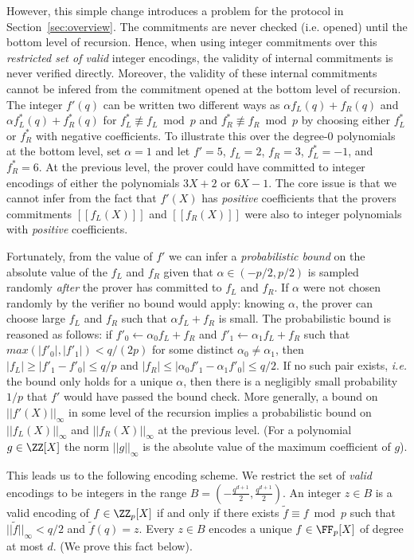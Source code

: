 However, this simple change introduces a problem for the protocol in Section~\ref{sec:overview}. The commitments are never checked (i.e. opened) until the bottom level of recursion. Hence, when using integer commitments over this \emph{restricted set of valid} integer encodings, the validity of internal commitments is never verified directly. Moreover, the validity of these internal commitments cannot be infered from the commitment opened at the bottom level of recursion. The integer $f'(q)$ can be written two different ways as $\alpha f_L(q) + f_R(q)$ and $\alpha f_L^*(q) + f_R^*(q)$ for $f^*_L \not \equiv f_L \bmod p$ and $f_R^* \not \equiv f_R \bmod p$ by choosing either $f_L^*$ or $f_R^*$ with negative coefficients. To illustrate this over the degree-0 polynomials at the bottom level, set $\alpha = 1$ and let $f' = 5$, $f_L = 2$, $f_R = 3$, $f_L^* = -1$, and $f^*_R = 6$. At the previous level, the prover could have committed to integer encodings of either the polynomials $3X + 2$ or $6X - 1$. The core issue is that we cannot infer from the fact that $f'(X)$ has \emph{positive} coefficients that the provers commitments $[\![f_L(X)]\!]$ and $[\![f_R(X)]\!]$ were also to integer polynomials with \emph{positive} coefficients. 

Fortunately, from the value of $f'$ we can infer a \emph{probabilistic bound} on the absolute value of the $f_L$ and $f_R$ given that $\alpha \in (-p/2, p/2)$ is sampled randomly \emph{after} the prover has committed to $f_L$ and $f_R$. If $\alpha$ were not chosen randomly by the verifier no bound would apply: knowing $\alpha$, the prover can choose large $f_L$ and $f_R$ such that $\alpha f_L + f_R$ is small. The probabilistic bound is reasoned as follows: if $f'_0 \leftarrow \alpha_0 f_L + f_R$ and $f'_1 \leftarrow \alpha_1 f_L + f_R$ such that $max(|f'_0|, |f'_1|) < q / (2p)$ for some distinct $\alpha_0 \neq \alpha_1$, then $|f_L| \geq |f'_1 - f'_0| \leq q / p$ and $|f_R| \leq |\alpha_0 f'_1 - \alpha_1 f'_0| \leq q/2$. If no such pair exists, \emph{i.e.} the bound only holds for a unique $\alpha$, then there is a negligibly small probability $1/p$ that $f'$ would have passed the bound check. 
More generally, a bound on $||f'(X)||_\infty$ in some level of the recursion implies a probabilistic bound on $||f_L(X)||_\infty$ and $||f_R(X)||_\infty$ at the previous level. (For a polynomial $g \in \ZZ[X]$ the norm $||g||_\infty$ is the absolute value of the maximum coefficient of $g$).

This leads us to the following encoding scheme. We restrict the set of \emph{valid} encodings to be integers in the range $B = (-\frac{q^{d+1}}{2}, \frac{q^{d+1}}{2})$. An integer $z \in B$ is a valid encoding of $f \in \ZZ_p[X]$ if and only if there exists $\tilde{f} \equiv f \bmod p$ such that $||\tilde{f}||_\infty < q/2$ and $\tilde{f}(q) = z$. Every $z \in B$ encodes a unique $f \in \FF_p[X]$ of degree at most $d$. (We prove this fact below). 

